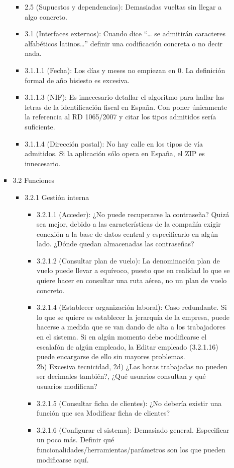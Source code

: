 \documentclass[11pt, a4paper, twoside, titlepage]{article}
\begin{document}
\begin{itemize}
\begin{itemize}
\begin{itemize}
\begin{itemize}
								\item 2.5 (Supuestos y dependencias): Demasiadas vueltas sin llegar a algo concreto. 
								\item 3.1 (Interfaces externos): Cuando dice “… se admitirán caracteres alfabéticos latinos…” definir una codificación concreta o no decir nada. 
								\item 3.1.1.1 (Fecha): Los días y meses no empiezan en 0. La definición formal de año bisiesto es excesiva. 
								\item 3.1.1.3 (NIF): Es innecesario detallar el algoritmo para hallar las letras de la identificación fiscal en España. Con poner únicamente la referencia al RD 1065/2007 y citar los tipos admitidos sería suficiente. 
								\item 3.1.1.4 (Dirección postal): No hay calle en los tipos de vía admitidos. Si la aplicación sólo opera en España, el ZIP es innecesario.
								\end{itemize}
							\item  3.2 Funciones 
								\begin{itemize}
								\item 3.2.1 Gestión interna
									\begin{itemize}
									\item 3.2.1.1 (Acceder): ¿No puede recuperarse la contraseña? 
										Quizá sea mejor, debido a las características de la compañía exigir conexión a la base de datos central y especificarlo en algún lado. ¿Dónde quedan almacenadas las contraseñas?
									\item 3.2.1.2 (Consultar plan de vuelo): La denominación plan de vuelo puede llevar a equívoco, puesto que en realidad lo que se quiere hacer en consultar una ruta aérea, no un plan de vuelo concreto. 
									\item 3.2.1.4 (Establecer organización laboral): Caso redundante. Si lo que se quiere es establecer la jerarquía de la empresa, puede hacerse a medida que se van dando de alta a los trabajadores en el sistema. Si en algún momento debe modificarse el escalafón de algún empleado, la Editar empleado (3.2.1.16) puede encargarse de ello sin mayores problemas. \\
									 2b) Excesiva tecnicidad, 2d) ¿Las horas trabajadas no pueden ser decimales también?, ¿Qué usuarios consultan y qué usuarios modifican? 
									\item 3.2.1.5 (Consultar ficha de clientes): ¿No debería existir una función que sea Modificar ficha de clientes? 
									\item 3.2.1.6 (Configurar el sistema): Demasiado general. Especificar un poco más. Definir qué funcionalidades/herramientas/parámetros son los que pueden modificarse aquí. 

\end{itemize}
\end{itemize}
\end{itemize}
\end{itemize}
\end{itemize}
\end{document}
